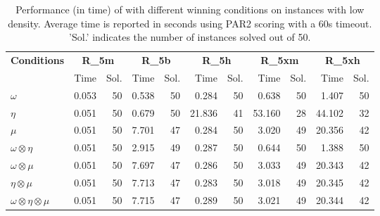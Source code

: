\documentclass[a4paper,UKenglish,cleveref, autoref, thm-restate, anonymous]{lipics-v2021}
\begin{document}
\begin{table}[ht]
\centering
\caption{Performance (in time) of \nocq with different winning conditions on instances with low density. Average time is reported in seconds using PAR2 scoring with a 60s timeout. 'Sol.' indicates the number of instances solved out of 50.}
\setlength{\tabcolsep}{1.2mm}
{\small 
\begin{tabular}{l|rr|rr|rr|rr|rr}
\toprule
\textbf{Conditions} & \multicolumn{2}{c|}{\textbf{R\_5m}} & \multicolumn{2}{c|}{\textbf{R\_5b}} & \multicolumn{2}{c|}{\textbf{R\_5h}} & \multicolumn{2}{c|}{\textbf{R\_5xm}} & \multicolumn{2}{c}{\textbf{R\_5xh}} \\
& Time & Sol. & Time & Sol. & Time & Sol. & Time & Sol. & Time & Sol. \\
\midrule
\textbf{$\omega$}
    & 0.053 & 50 & 0.538 & 50 & 0.284 & 50 & 0.638 & 50 & 1.407 & 50 \\
\textbf{$\eta$}
    & 0.051 & 50 & 0.679 & 50 & 21.836& 41 & 53.160& 28 & 44.102& 32 \\
\textbf{$\mu$}
    & 0.051 & 50 & 7.701 & 47 & 0.284 & 50 & 3.020 & 49 & 20.356& 42 \\
\textbf{$\omega \otimes \eta$}
    & 0.051 & 50 & 2.915 & 49 & 0.287 & 50 & 0.644 & 50 & 1.388 & 50 \\
\textbf{$\omega \otimes \mu$}
    & 0.051 & 50 & 7.697 & 47 & 0.286 & 50 & 3.033 & 49 & 20.343& 42 \\
\textbf{$\eta \otimes \mu$}
    & 0.051 & 50 & 7.713 & 47 & 0.283 & 50 & 3.018 & 49 & 20.345& 42 \\
\textbf{$\omega \otimes \eta \otimes \mu$}
    & 0.051 & 50 & 7.715 & 47 & 0.289 & 50 & 3.021 & 49 & 20.344& 42 \\
\bottomrule
\end{tabular}
}
\label{tab:quantitative-small}
\end{table}
\end{document}
